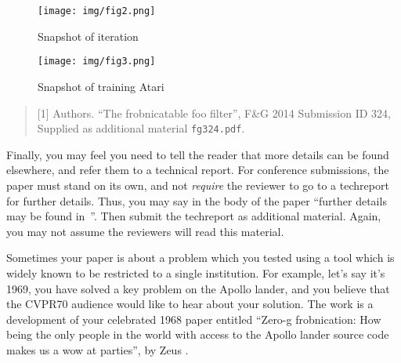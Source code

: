 \documentclass[10pt,twocolumn,letterpaper]{article}
\begin{document}
	\begin{figure}[H]
		\begin{center}
			\texttt{[image: img/fig2.png]}
		\end{center}
		\caption{Snapshot of iteration}
		\label{fig:long}
		\label{fig:onecol}
	\end{figure}
	\begin{figure}[H]
		\begin{center}
			\texttt{[image: img/fig3.png]}
		\end{center}
		\caption{Snapshot of training  Atari}
		\label{fig:long}
		\label{fig:onecol}
	\end{figure}
	
	
	\begin{quote}
		[1] Authors. ``The frobnicatable foo filter'', F\&G 2014 Submission ID 324,
		Supplied as additional material {\tt fg324.pdf}.
	\end{quote}
	
	Finally, you may feel you need to tell the reader that more details can be
	found elsewhere, and refer them to a technical report.  For conference
	submissions, the paper must stand on its own, and not {\em require} the
	reviewer to go to a techreport for further details.  Thus, you may say in
	the body of the paper ``further details may be found
	in~\cite{Authors14b}''.  Then submit the techreport as additional material.
	Again, you may not assume the reviewers will read this material.
	
	Sometimes your paper is about a problem which you tested using a tool which
	is widely known to be restricted to a single institution.  For example,
	let's say it's 1969, you have solved a key problem on the Apollo lander,
	and you believe that the CVPR70 audience would like to hear about your
	solution.  The work is a development of your celebrated 1968 paper entitled
	``Zero-g frobnication: How being the only people in the world with access to
	the Apollo lander source code makes us a wow at parties'', by Zeus \etal.
	
\end{document}
